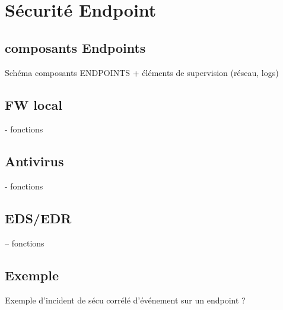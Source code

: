 

\section{Sécurité Endpoint}
\subsection{composants Endpoints}
Schéma composants ENDPOINTS + éléments de supervision (réseau, logs)
\subsection{FW local}
- fonctions
\subsection{Antivirus}
- fonctions
\subsection{EDS/EDR}
– fonctions
\subsection{Exemple}
Exemple d’incident de sécu corrélé d’événement sur un endpoint ?







